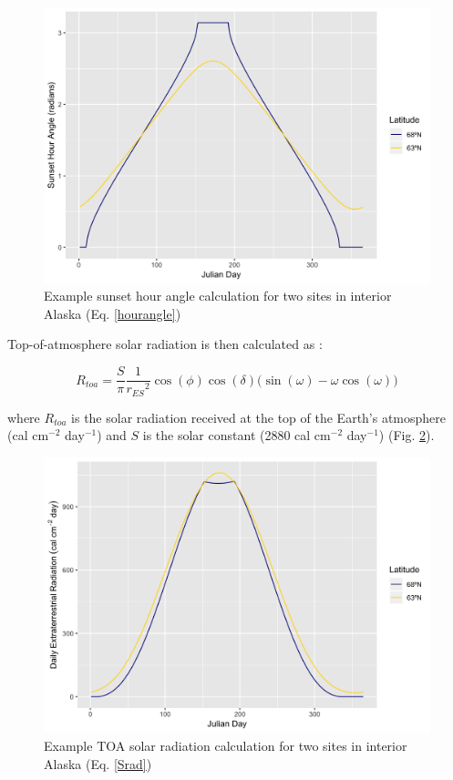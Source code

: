 \documentclass[a4paper, 12pt] {report}
\begin{document}
\begin{figure}
  \includegraphics[width=0.75\linewidth]{Figures/SunsetHourAngle.png}
  \caption{Example sunset hour angle calculation for two sites in interior Alaska (Eq. \ref{hourangle})}
  \label{fig:sunset}
\end{figure}

Top-of-atmosphere solar radiation is then calculated as \cite{kleinCalculationMonthlyAverage1977}:

\begin{equation}\label{Srad}
R_{toa} = \frac{S}{\pi}\frac{1}{{r_{ES}}^2}\cos{(\phi)}\cos{(\delta)}\Big(\sin{(\omega)} - \omega\cos{(\omega)}\Big)
\end{equation}

where $R_{toa}$ is the solar radiation received at the top of the Earth's atmosphere (cal cm$^{-2}$ day$^{-1}$) and $S$ is the solar constant (2880 cal cm$^{-2}$ day$^{-1}$) (Fig. \ref{fig:toa}).

\begin{figure}[H]
  \includegraphics[width=0.75\linewidth]{Figures/SolarRad_toa.png}
  \caption{Example TOA solar radiation calculation for two sites in interior Alaska  (Eq. \ref{Srad})}
  \label{fig:toa}
\end{figure}
\end{document}
